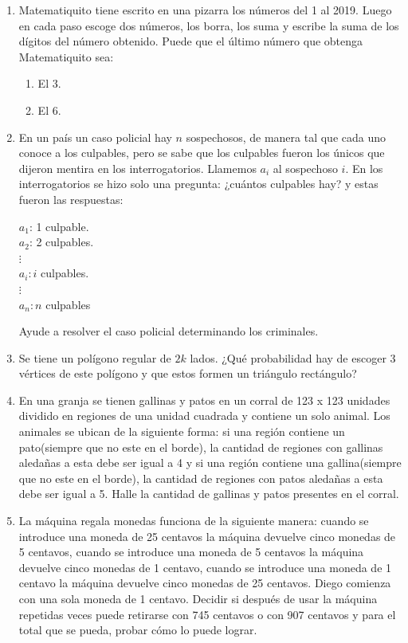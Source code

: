 \documentclass{book}
\begin{document}
\begin{enumerate}
\begin{enumerate}
					\end{enumerate}
				\item Matematiquito tiene escrito en una pizarra los números del 1 al 2019. Luego en cada paso escoge dos números, los borra, los suma y escribe la suma de los dígitos del número obtenido. Puede que el último número que obtenga Matematiquito sea:
 					\begin{enumerate}
 						\item El 3. 
 						\item El 6.
					\end{enumerate} 					 
				\item En un país un caso policial hay $n$ sospechosos, de manera tal que cada uno conoce a los culpables, pero se sabe que los culpables fueron los únicos que dijeron mentira en los interrogatorios. Llamemos $a_i$ al sospechoso $i$. En los interrogatorios  se hizo solo una pregunta: ¿cuántos culpables hay? y estas fueron las respuestas:
					\begin{center}
						$a_1$: 1 culpable.\\
$a_2$: 2 culpables.\\
$\vdots$\\
$a_i: i$ culpables.\\
$\vdots$\\
$a_n: n$ culpables
					\end{center}
					Ayude a resolver el caso policial determinando los criminales.
				\item Se tiene un polígono regular de $2k$ lados. ¿Qué probabilidad hay de escoger 3 vértices de este polígono y que estos formen un triángulo rectángulo?
				\item En una granja se tienen gallinas y patos en un corral de 123 x 123 unidades dividido en regiones de una unidad cuadrada y contiene un solo animal. Los animales se ubican de la siguiente forma: si una región contiene un pato(siempre que no este en el borde), la cantidad de regiones con gallinas aledañas a esta debe ser igual a 4 y si una región contiene una gallina(siempre que no este en el borde), la cantidad de regiones con patos aledañas a esta debe ser igual a 5. Halle la cantidad de gallinas y patos presentes en el corral.
				\item La máquina regala monedas funciona de la siguiente manera: cuando se introduce una moneda de 25 centavos la máquina devuelve cinco monedas de 5 centavos, cuando se introduce una moneda de 5 centavos la máquina devuelve cinco monedas de 1 centavo, cuando se introduce una moneda de 1 centavo la máquina devuelve cinco monedas de 25 centavos. Diego comienza con una sola moneda de 1 centavo. Decidir si después de usar la máquina repetidas veces puede retirarse con 745 centavos o con 907 centavos y para el total que se pueda, probar cómo lo puede lograr.

\end{enumerate}
\end{document}
